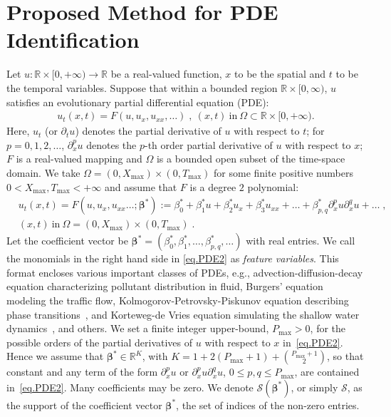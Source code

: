 \documentclass[a4paper,11pt]{article}
\newcommand{\bbeta}{\bm{\beta}}
\theoremstyle{definition}
\begin{document}
\section{Proposed Method for PDE Identification} \label{sec:model}

Let $u:\mathbb{R}\times[0,+\infty)\to\mathbb{R}$ be a real-valued function, $x$ to be the spatial and $t$ to be the temporal variables.  Suppose that within a bounded region $\mathbb{R}\times[0,\infty)$, $u$ satisfies an evolutionary partial differential equation (PDE):
\begin{align*}
u_t(x,t) = F(u,u_x,u_{xx},\dots)	\;,~(x,t)~\text{in}~\Omega\subset\mathbb{R}\times[0,+\infty). %
\end{align*}
Here, $u_t$ (or $\partial_tu$) denotes the partial derivative of $u$ with respect to $t$; for $p=0,1,2,\dots$, $\partial^{p}_xu$ denotes the $p$-th order partial derivative of $u$ with respect to $x$; $F$ is a real-valued mapping and $\Omega$ is a bounded open subset of the time-space domain.  We take $\Omega=(0,X_{\max})\times(0,T_{\max})$ for some finite positive numbers $0<X_{\max}, T_{\max}<+\infty$ and assume that $F$ is a degree $2$ polynomial:
\begin{align}
&u_t(x,t) = F(u,u_x,u_{xx}\dots;\bbeta^*):=\beta^*_0+\beta^*_1u+\beta^*_2u_x+\beta^*_3u_{xx}+\dots+\beta^*_{p,q}\partial^p_xu\partial^q_xu+\dots	\;,\nonumber\\
&(x,t)~\text{in}~\Omega = (0,X_{\max})\times(0,T_{\max})\;. \label{eq.PDE2}
\end{align}
Let the coefficient vector  be $\bbeta^*=(\beta^*_0,\beta^*_1,\dots,\beta^*_{p,q},\dots)$ with real entries. We call the monomials  in the right hand side in \eqref{eq.PDE2} as \textit{feature variables}. This format encloses various important classes of PDEs, e.g., advection-diffusion-decay equation characterizing pollutant distribution in fluid, Burgers' equation modeling the traffic flow, Kolmogorov-Petrovsky-Piskunov equation describing phase transitions~\cite{tikhomirov1991study}, and Korteweg-de Vries equation simulating the shallow water dynamics~\cite{newell1985solitons}, and others.
%
We set a finite integer upper-bound, $P_{\max}>0$, for the possible orders of the partial derivatives of $u$ with respect to $x$ in~\eqref{eq.PDE2}. Hence we assume that $\bbeta^*\in\mathbb{R}^{K}$, with $K=1+2(P_{\max}+1)+{{P_{\max}+1}\choose{2}}$, so that constant and any term of the form $\partial_x^pu$ or $\partial^p_xu\partial_x^qu$, $0\leq p,q\leq P_{\max}$, are contained  in~\eqref{eq.PDE2}.   Many coefficients may be zero.
We denote $\mathcal{S}(\bbeta^*)$, or simply $\mathcal{S}$,  as the support of the coefficient vector $\bbeta^*$, the set of indices of the non-zero entries. %
\end{document}
